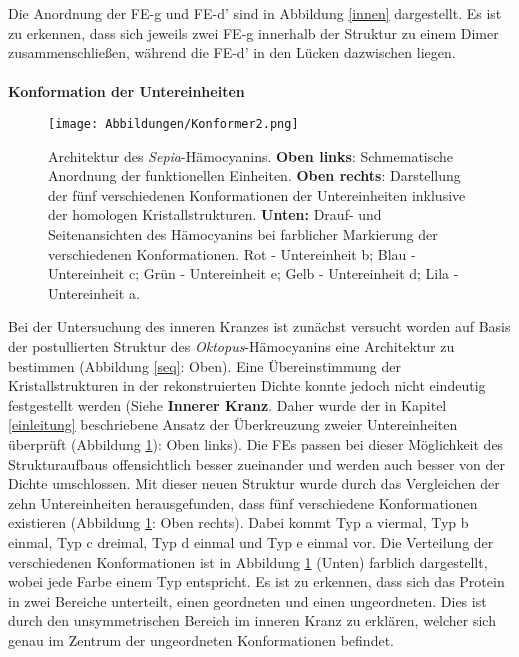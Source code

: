 Die Anordnung der FE-g und FE-d' sind in Abbildung \ref{innen} dargestellt.
Es ist zu erkennen, dass sich jeweils zwei FE-g innerhalb der Struktur zu einem Dimer zusammenschließen, während die FE-d' in den Lücken dazwischen liegen.
\\
\\
\textbf{Konformation der Untereinheiten}\\
\begin{figure}[h!]
\texttt{[image: Abbildungen/Konformer2.png]}
\caption[Architektur des \textit{Sepia}-Hämocyanins]{Architektur des \textit{Sepia}-Hämocyanins. \textbf{Oben links}: Schmematische Anordnung der funktionellen Einheiten. \textbf{Oben rechts}: Darstellung der fünf verschiedenen Konformationen der Untereinheiten inklusive der homologen Kristallstrukturen. \textbf{Unten:} Drauf- und Seitenansichten des Hämocyanins bei farblicher Markierung der verschiedenen Konformationen. Rot - Untereinheit b; Blau - Untereinheit c; Grün - Untereinheit e; Gelb - Untereinheit d; Lila - Untereinheit a.}
\label{done}
\end{figure}
Bei der Untersuchung des inneren Kranzes ist zunächst versucht worden auf Basis der postullierten Struktur des \textit{Oktopus}-Hämocyanins eine Architektur zu bestimmen (Abbildung \ref{seq}: Oben).
Eine Übereinstimmung der Kristallstrukturen in der rekonstruierten Dichte konnte jedoch nicht eindeutig festgestellt werden (Siehe \textbf{Innerer Kranz}.
Daher wurde der in Kapitel \ref{einleitung} beschriebene Ansatz der Überkreuzung zweier Untereinheiten überprüft (Abbildung \ref{done}): Oben links).
Die FEs passen bei dieser Möglichkeit des Strukturaufbaus offensichtlich besser zueinander und werden auch besser von der Dichte umschlossen.
Mit dieser neuen Struktur wurde durch das Vergleichen der zehn Untereinheiten herausgefunden, dass fünf verschiedene Konformationen existieren (Abbildung \ref{done}: Oben rechts).
Dabei kommt Typ a viermal, Typ b einmal, Typ c dreimal, Typ d einmal und Typ e einmal vor.
Die Verteilung der verschiedenen Konformationen ist in Abbildung \ref{done} (Unten) farblich dargestellt, wobei jede Farbe einem Typ entspricht.
Es ist zu erkennen, dass sich das Protein in zwei Bereiche unterteilt, einen geordneten und einen ungeordneten.
Dies ist durch den unsymmetrischen Bereich im inneren Kranz zu erklären, welcher sich genau im Zentrum der ungeordneten Konformationen befindet.

